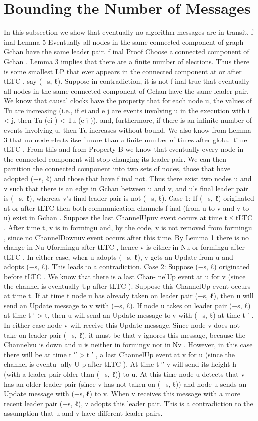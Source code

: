 \section{Bounding the Number of Messages}
In this subsection we show that eventually no algorithm messages are in transit. f inal Lemma 5 Eventually all nodes in the same connected component of graph Gchan have the same leader pair. f inal Proof Choose a connected component of Gchan . Lemma 3 implies that there are a finite number of elections. Thus there is some smallest LP that ever appears in the connected component at or after tLTC , say (−s, ℓ). Suppose in contradiction, it is not f inal true that eventually all nodes in the same connected component of Gchan have the same leader pair. We know that causal clocks have the property that for each node u, the values of Tu are increasing (i.e., if ei and e j are events involving u in the execution with i < j, then Tu (ei ) < Tu (e j )), and, furthermore, if there is an infinite number of events involving u, then Tu increases without bound. We also know from Lemma 3 that no node elects itself more than a finite number of times after global time tLTC . From this and from Property B we know that eventually every node in the connected component will stop changing its leader pair. We can then partition the connected component into two sets of nodes, those that have adopted (−s, ℓ) and those that have f inal not. Thus there exist two nodes u and v such that there is an edge in Gchan between u and v, and u’s final leader pair is (−s, ℓ), whereas v’s final leader pair is not (−s, ℓ). Case 1: If (−s, ℓ) originated at or after tLTC then both communication channels f inal (from u to v and v to u) exist in Gchan . Suppose the last ChannelUpuv event occurs at time t ≤ tLTC . After time t, v is in formingu and, by the code, v is not removed from formingu , since no ChannelDownuv event occurs after this time. By Lemma 1 there is no change in Nu ∪formingu after tLTC , hence v is either in Nu or formingu after tLTC . In either case, when u adopts (−s, ℓ), v gets an Update from u and adopts (−s, ℓ). This leads to a contradiction. Case 2: Suppose (−s, ℓ) originated before tLTC . We know that there is a last Chan- nelUp event at u for v (since the channel is eventually Up after tLTC ). Suppose this ChannelUp event occurs at time t. If at time t node u has already taken on leader pair (−s, ℓ), then u will send an Update message to v with (−s, ℓ). If node u takes on leader pair (−s, ℓ) at time t ′ > t, then u will send an Update message to v with (−s, ℓ) at time t ′ . In either case node v will receive this Update message. Since node v does not take on leader pair (−s, ℓ), it must be that v ignores this message, because the Channelvu is down and u is neither in formingv nor in Nv . However, in this case there will be at time t ′′ > t ′ , a last ChannelUp event at v for u (since the channel is eventu- ally U p after tLTC ). At time t ′′ v will send its height h (with a leader pair older than (−s, ℓ)) to u. At this time node u detects that v has an older leader pair (since v has not taken on (−s, ℓ)) and node u sends an Update message with (−s, ℓ) to v. When v receives this message with a more recent leader pair (−s, ℓ), v adopts this leader pair. This is a contradiction to the assumption that u and v have different leader pairs.
